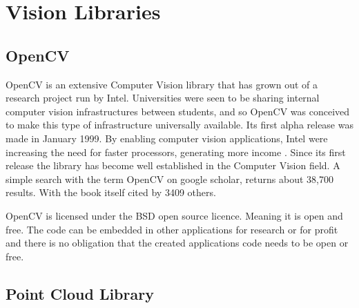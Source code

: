 \documentclass[11pt,oneside]{report}
\begin{document}
					
			\section{Vision Libraries}
				\subsection{OpenCV}
				OpenCV is an extensive Computer Vision library that has grown out of a research project run by Intel.
				Universities were seen to be sharing internal computer vision infrastructures between students, and so OpenCV was conceived to make this type of infrastructure universally available.
				Its first alpha release was made in January 1999.
				By enabling computer vision applications, Intel were increasing the need for faster processors, generating more income \cite{definition:cv}.
				Since its first release the library has become well established in the Computer Vision field.
				A simple search with the term OpenCV on google scholar, returns about 38,700 results.
				With the  book itself cited by 3409 others.
				
				OpenCV is licensed under the BSD open source licence.
				Meaning it is open and free.
				The code can be embedded in other applications for research or for profit and there is no obligation that the created applications code needs to be open or free.
				
				
				\subsection{Point Cloud Library}
				
\end{document}
